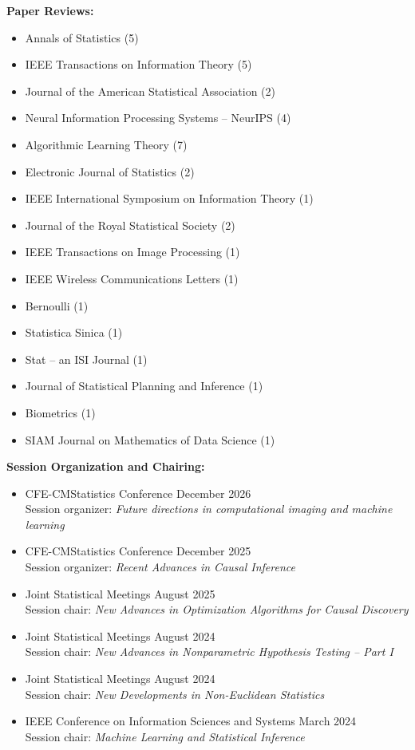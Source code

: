 \documentclass[11pt]{article}
\begin{document}
	\noindent\textbf{Paper Reviews:}
	\begin{itemize}
		\item Annals of Statistics (5)
		\item IEEE Transactions on Information Theory (5)
		\item Journal of the American Statistical Association (2)
		\item Neural Information Processing Systems -- NeurIPS (4) 
		\item Algorithmic Learning Theory (7)
		\item Electronic Journal of Statistics (2)
		\item IEEE International Symposium on Information Theory (1)
		\item Journal of the Royal Statistical Society (2)
		\item IEEE Transactions on Image Processing (1)
		\item IEEE Wireless Communications Letters (1)
		\item Bernoulli (1)
		\item Statistica Sinica (1)
		\item Stat -- an ISI Journal (1)
		\item Journal of Statistical Planning and Inference (1)
		\item Biometrics (1)
		\item SIAM Journal on Mathematics of Data Science (1)
	\end{itemize}
	
	\noindent\textbf{Session Organization and Chairing:}
	\begin{itemize}[leftmargin=0pt, label={}]
		
		\item CFE-CMStatistics Conference \hfill December 2026 \\
		Session organizer: \textit{Future directions in computational imaging and machine learning }
		
		\item CFE-CMStatistics Conference \hfill December 2025\\ 
		Session organizer: \textit{Recent Advances in Causal Inference}
		\item Joint Statistical Meetings \hfill August 2025\\
		Session chair: \textit{New Advances in Optimization Algorithms for Causal Discovery}
		\item Joint Statistical Meetings  \hfill August 2024\\
		Session chair: \textit{New Advances in Nonparametric Hypothesis Testing -- Part I}
		\item Joint Statistical Meetings \hfill August 2024\\ 
		Session chair: \textit{New Developments in Non-Euclidean Statistics}
		\item IEEE Conference on Information Sciences and Systems \hfill March 2024\\ 
		Session chair: \textit{Machine Learning and Statistical Inference}
	\end{itemize}
	
\end{document}
